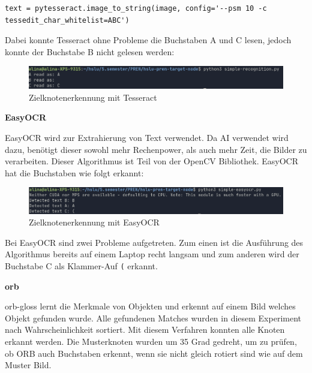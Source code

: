 \begin{verbatim}
text = pytesseract.image_to_string(image, config='--psm 10 -c
tessedit_char_whitelist=ABC')
\end{verbatim}

Dabei konnte Tesseract ohne Probleme die Buchstaben A und C lesen, jedoch konnte der Buchstabe B nicht gelesen werden:

\begin{figure}[H]
\includegraphics[width=0.95\linewidth]{assets/informatik-prototyp/opencv/target_node_detection/tesseract.png} 
\caption{Zielknotenerkennung mit Tesseract}
\label{fig:zielknoten-tesseract}
\end{figure}


\textbf{EasyOCR}

EasyOCR wird zur Extrahierung von Text verwendet. Da AI verwendet wird dazu, benötigt dieser sowohl mehr Rechenpower, als auch mehr Zeit, die Bilder zu verarbeiten. Dieser Algorithmus ist Teil von der OpenCV Bibliothek. EasyOCR hat die Buchstaben wie folgt erkannt:

\begin{figure}[H]
\includegraphics[width=0.95\linewidth]{assets/informatik-prototyp/opencv/target_node_detection/easyocr.png} 
\caption{Zielknotenerkennung mit EasyOCR}
\label{fig:zielknoten-easyocr}
\end{figure}

Bei EasyOCR sind zwei Probleme aufgetreten. Zum einen ist die Ausführung des Algorithmus bereits auf einem Laptop recht langsam und zum anderen wird der Buchstabe C als Klammer-Auf \verb|(| erkannt.

\textbf{\acrfull{orb}}

\gls{orb-gloss} lernt die Merkmale von Objekten und erkennt auf einem Bild welches Objekt gefunden wurde. Alle gefundenen Matches wurden in diesem Experiment nach Wahrscheinlichkeit sortiert. Mit diesem Verfahren konnten alle Knoten erkannt werden. Die Musterknoten wurden um 35 Grad gedreht, um zu prüfen, ob ORB auch Buchstaben erkennt, wenn sie nicht gleich rotiert sind wie auf dem Muster Bild.


